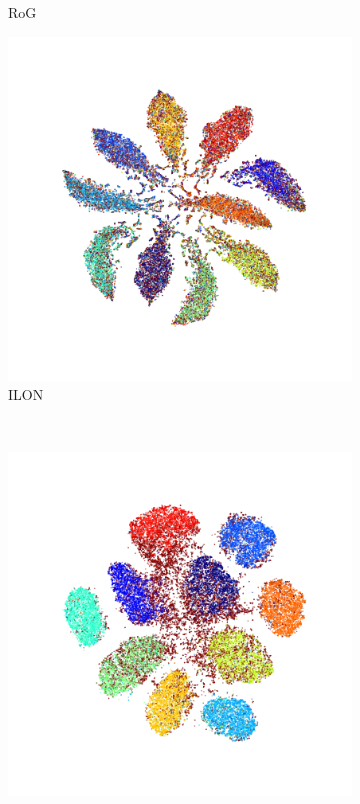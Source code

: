 \documentclass[12pt]{article}
\begin{document}
\begin{figure}[t]
\begin{subfigure}{.18\textwidth}
     \caption*{RoG~}
    \end{subfigure}
    \begin{subfigure}{.18\textwidth}
      \centering
      \includegraphics[width=\linewidth]{images/tsne/tsne_ILON_cifar100.png}
      \caption*{ILON~}
    \end{subfigure}
    \\
    \begin{subfigure}{.18\textwidth}
      \centering
      \includegraphics[width=\linewidth]{images/tsne/tsne_DM_imagenet32.png} 

\end{subfigure}
\end{figure}
\end{document}
